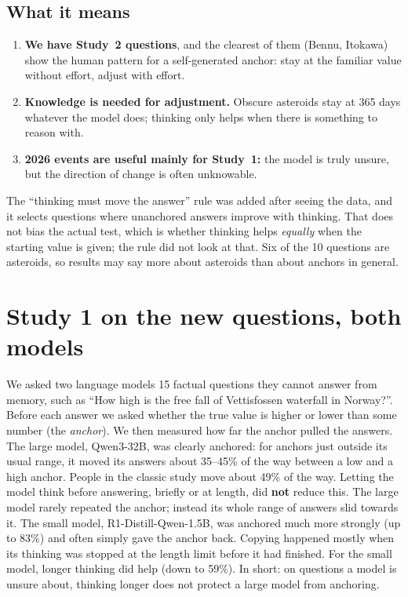 \documentclass[11pt,a4paper]{article}
\begin{document}
\subsection{What it means}
\begin{enumerate}[leftmargin=*]
  \item \textbf{We have Study~2 questions}, and the clearest of them (Bennu, Itokawa) show the human pattern for a self-generated anchor: stay at the familiar value without effort, adjust with effort.
  \item \textbf{Knowledge is needed for adjustment.} Obscure asteroids stay at 365 days whatever the model does; thinking only helps when there is something to reason with.
  \item \textbf{2026 events are useful mainly for Study~1:} the model is truly unsure, but the direction of change is often unknowable.
\end{enumerate}

\begin{cautionbox}
The \enquote{thinking must move the answer} rule was added after seeing the data, and it selects questions where unanchored answers improve with thinking. That does not bias the actual test, which is whether thinking helps \emph{equally} when the starting value is given; the rule did not look at that. Six of the 10 questions are asteroids, so results may say more about asteroids than about anchors in general.
\end{cautionbox}

\section{Study 1 on the new questions, both models}
\label{sec:e6}

\begin{inshort}
We asked two language models 15 factual questions they cannot answer from memory, such as \enquote{How high is the free fall of Vettisfossen waterfall in Norway?}. Before each answer we asked whether the true value is higher or lower than some number (the \emph{anchor}). We then measured how far the anchor pulled the answers. The large model, Qwen3-32B, was clearly anchored: for anchors just outside its usual range, it moved its answers about 35--45\% of the way between a low and a high anchor. People in the classic study move about 49\% of the way. Letting the model think before answering, briefly or at length, did \textbf{not} reduce this. The large model rarely repeated the anchor; instead its whole range of answers slid towards it. The small model, R1-Distill-Qwen-1.5B, was anchored much more strongly (up to 83\%) and often simply gave the anchor back. Copying happened mostly when its thinking was stopped at the length limit before it had finished. For the small model, longer thinking did help (down to 59\%). In short: on questions a model is unsure about, thinking longer does not protect a large model from anchoring.
\end{inshort}
\end{document}
